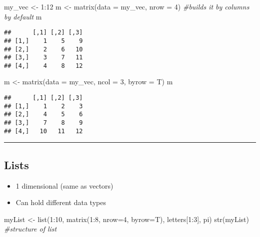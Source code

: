 \documentclass[
]{article}
\newenvironment{Shaded}{\begin{snugshade}}{\end{snugshade}}
\newcommand{\AttributeTok}[1]{\textcolor[rgb]{0.77,0.63,0.00}{#1}}
\newcommand{\CommentTok}[1]{\textcolor[rgb]{0.56,0.35,0.01}{\textit{#1}}}
\newcommand{\DecValTok}[1]{\textcolor[rgb]{0.00,0.00,0.81}{#1}}
\newcommand{\FunctionTok}[1]{\textcolor[rgb]{0.00,0.00,0.00}{#1}}
\newcommand{\NormalTok}[1]{#1}
\newcommand{\OtherTok}[1]{\textcolor[rgb]{0.56,0.35,0.01}{#1}}
\newcommand{\SpecialCharTok}[1]{\textcolor[rgb]{0.00,0.00,0.00}{#1}}
\providecommand{\tightlist}{%
  \setlength{\itemsep}{0pt}\setlength{\parskip}{0pt}}
\begin{document}
\begin{Shaded}
\begin{Highlighting}[]
\NormalTok{my\_vec }\OtherTok{\textless{}{-}} \DecValTok{1}\SpecialCharTok{:}\DecValTok{12}
\NormalTok{m }\OtherTok{\textless{}{-}} \FunctionTok{matrix}\NormalTok{(}\AttributeTok{data =}\NormalTok{ my\_vec, }\AttributeTok{nrow =} \DecValTok{4}\NormalTok{) }\CommentTok{\#builds it by columns by default}
\NormalTok{m}
\end{Highlighting}
\end{Shaded}

\begin{verbatim}
##      [,1] [,2] [,3]
## [1,]    1    5    9
## [2,]    2    6   10
## [3,]    3    7   11
## [4,]    4    8   12
\end{verbatim}

\begin{Shaded}
\begin{Highlighting}[]
\NormalTok{m }\OtherTok{\textless{}{-}} \FunctionTok{matrix}\NormalTok{(}\AttributeTok{data =}\NormalTok{ my\_vec, }\AttributeTok{ncol =} \DecValTok{3}\NormalTok{, }\AttributeTok{byrow =}\NormalTok{ T)}
\NormalTok{m}
\end{Highlighting}
\end{Shaded}

\begin{verbatim}
##      [,1] [,2] [,3]
## [1,]    1    2    3
## [2,]    4    5    6
## [3,]    7    8    9
## [4,]   10   11   12
\end{verbatim}

\begin{center}\rule{0.5\linewidth}{0.5pt}\end{center}

\hypertarget{lists}{%
\subsection{Lists}\label{lists}}

\begin{itemize}
\tightlist
\item
  1 dimensional (same as vectors)
\item
  Can hold different data types
\end{itemize}

\begin{Shaded}
\begin{Highlighting}[]
\NormalTok{myList }\OtherTok{\textless{}{-}} \FunctionTok{list}\NormalTok{(}\DecValTok{1}\SpecialCharTok{:}\DecValTok{10}\NormalTok{, }\FunctionTok{matrix}\NormalTok{(}\DecValTok{1}\SpecialCharTok{:}\DecValTok{8}\NormalTok{, }\AttributeTok{nrow=}\DecValTok{4}\NormalTok{, }\AttributeTok{byrow=}\NormalTok{T), letters[}\DecValTok{1}\SpecialCharTok{:}\DecValTok{3}\NormalTok{], pi)}
\FunctionTok{str}\NormalTok{(myList) }\CommentTok{\#structure of list}
\end{Highlighting}
\end{Shaded}
\end{document}
